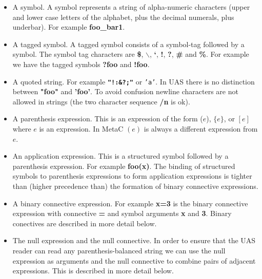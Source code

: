 \documentclass{article}
\begin{document}
\begin{itemize}
\item A symbol.  A symbol represents a string of alpha-numeric characters (upper and lower case letters of the alphabet, plus the decimal numerals, plus underbar).
  For example {\bf  foo\_bar1}.
\item A tagged symbol.  A tagged symbol consists of a symbol-tag followed by a symbol.  The symbol tag characters are {\bf \$}, {\bf $\backslash$}, {\bf `}, {\bf !}, {\bf ?}, {\bf \#} and {\bf \%}.
  For example we have the tagged symbols {\bf ?foo} and {\bf !foo}.
\item A quoted string.  For example {\bf \tt "!:\&?;"} or {\tt 'a'}.  In UAS there is no distinction between {\bf "foo"} and {\bf 'foo'}.  To avoid confusion newline characters are not allowed in strings (the two character sequence {\bf /n} is ok).
\item A parenthesis expression.  This is an expression of the form ($e$), $\{e\}$, or $[e]$ where $e$ is an expression.  In MetaC $(e)$ is always a different expression from $e$.
\item An application expression.  This is a structured symbol followed by a parenthesis expression.  For example {\bf foo(x)}.
The binding of structured symbols to parenthesis expressions to form application expressions is tighter than (higher precedence than) the formation of binary connective expressions.
\item A binary connective expression.  For example {\bf x=3} is the binary connective expression with connective {\bf =} and symbol arguments {\bf x} and {\bf 3}.  Binary conectives are described in more detail below.
\item The null expression and the null connective. In order to ensure that the UAS reader can read any parenthesis-balanced string we can use the null
  expression as arguments and the null connective to combine pairs of adjacent expressions.  This is described in more detail below.
\end{itemize}
\end{document}
